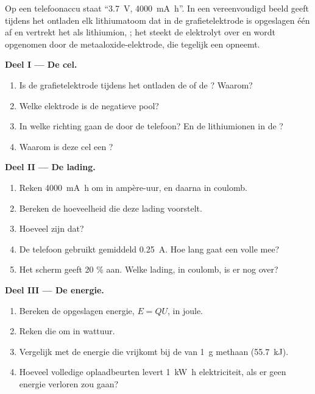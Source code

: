 \begin{problem}
\label{pb:g12:cells-and-electrolysis:1}
Op een telefoonaccu staat ``\qty{3.7}{V}, \qty{4000}{mA.h}''. In een
vereenvoudigd beeld geeft tijdens het ontladen elk lithiumatoom dat in de
grafietelektrode is opgeslagen één  af en vertrekt het als
lithiumion,
; het  steekt de elektrolyt over en wordt opgenomen
door de metaaloxide-elektrode, die tegelijk een  opneemt.

\medskip
\noindent\textbf{Deel I --- De cel.}
\begin{enumerate}
  \item Is de grafietelektrode tijdens het ontladen de  of de
        ? Waarom?
  \item Welke elektrode is de negatieve pool?
  \item In welke richting gaan de  door de telefoon? En de
        lithiumionen in de ?
  \item Waarom is deze cel een ?
\end{enumerate}

\medskip
\noindent\textbf{Deel II --- De lading.}
\begin{enumerate}[resume]
  \item Reken \qty{4000}{mA.h} om in ampère-uur, en daarna in coulomb.
  \item Bereken de hoeveelheid  die deze lading voorstelt.
  \item Hoeveel  zijn dat?
  \item De telefoon gebruikt gemiddeld \qty{0.25}{A}. Hoe lang gaat een
        volle  mee?
  \item Het scherm geeft 20 \% aan. Welke lading, in coulomb, is er nog
        over?
\end{enumerate}

\medskip
\noindent\textbf{Deel III --- De energie.}
\begin{enumerate}[resume]
  \item Bereken de opgeslagen energie, $E = Q U$, in joule.
  \item Reken die om in wattuur.
  \item Vergelijk met de energie die vrijkomt bij de  van
        \qty{1}{g} methaan (\qty{55.7}{kJ}).
  \item Hoeveel volledige oplaadbeurten levert \qty{1}{kW.h} elektriciteit,
        als er geen energie verloren zou gaan?
\end{enumerate}


\end{problem}
